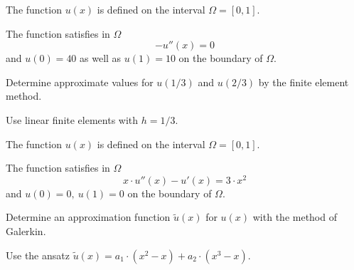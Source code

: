 \begin{teilaufgaben}
\item 
The function $u(x)$ is defined on the interval $\Omega = [0, 1].$

The function satisfies in $\Omega$ 
\[
-u''(x) = 0
\]
and $u(0) = 40$ as well as $u(1) = 10$ on the boundary of $\Omega$.  

Determine approximate values for $u(1/3)$ and $u(2/3)$ by the finite element method. 

Use linear finite elements with $h = 1/3$.
\item
The function $u(x)$ is defined on the interval $\Omega = [0, 1].$

The function satisfies in $\Omega$ 
\[
x \cdot u''(x) - u'(x) = 3 \cdot x^2
\]
and $u(0) = 0, \  u(1) = 0$ on the boundary of $\Omega$.  

Determine an approximation function $\tilde u(x)$ for $u(x)$ with the method of Galerkin.

Use the ansatz $\tilde u(x) = a_1 \cdot (x^2-x) + a_2 \cdot (x^3-x).$
\end{teilaufgaben}


